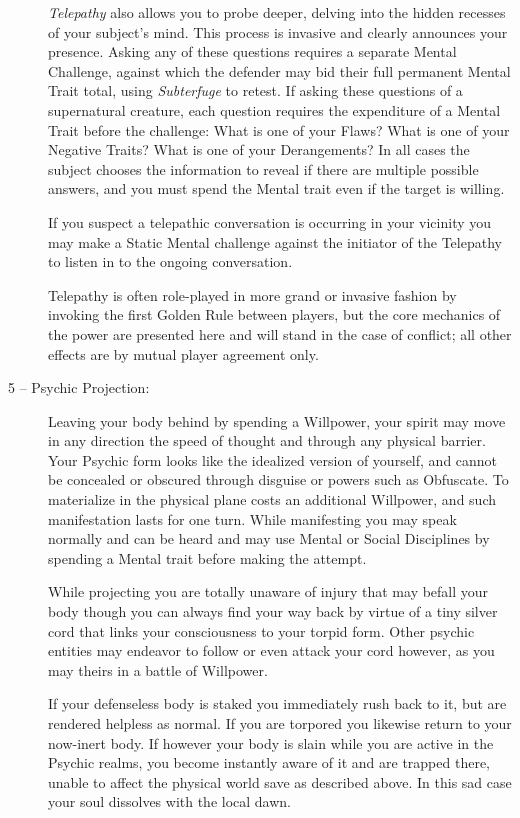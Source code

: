 \begin{description}
	\emph{Telepathy} also allows you to probe deeper, delving into the hidden recesses 
	of your subject's mind.  This process is invasive and clearly announces your presence.  
	Asking any of these questions requires a separate Mental Challenge, against which the 
	defender may bid their full permanent Mental Trait total, using \emph{Subterfuge} to 
	retest.  If asking these questions of a supernatural creature, each question requires 
	the expenditure of a Mental Trait before the challenge:  What is one of your Flaws?  
	What is one of your Negative Traits?  What is one of your Derangements?  In all cases 
	the subject chooses the information to reveal if there are multiple possible answers, 
	and you must spend the Mental trait even if the target is willing.
	
	If you suspect a telepathic conversation is occurring in your vicinity you may 
	make a Static Mental challenge against the initiator of the Telepathy to listen in 
	to the ongoing conversation.  
	
	Telepathy is often role-played in more grand or invasive fashion by invoking the first 
	Golden Rule between players, but the core mechanics of the power are presented here and 
	will stand in the case of conflict; all other effects are by mutual player agreement only.
	\item[5 -- Psychic Projection:]  Leaving your body behind by spending a Willpower, your 
	spirit may move in any direction the speed of thought and through any physical barrier.  Your 
	Psychic form looks like the idealized version of yourself, and cannot be concealed or obscured 
	through disguise or powers such as Obfuscate.  To materialize in the physical plane costs an 
	additional Willpower, and such manifestation lasts for one turn.  While manifesting 
	you may speak normally and can be heard and may use Mental or Social 
	Disciplines by spending a Mental trait before making the attempt. 
	
	While projecting you are totally unaware of injury that may befall your body though you 
	can always find your way back by virtue of a tiny silver cord that links your 
	consciousness to your torpid form.  Other psychic entities may endeavor to follow 
	or even attack your cord however, as you may theirs in a battle of Willpower.  
	
	If your defenseless body is staked you immediately rush back to it, but are rendered helpless as 
	normal.  If you are torpored you likewise return to your now-inert body.  If however your body is 
	slain while you are active in the Psychic realms, you become instantly aware of it and are trapped 
	there, unable to affect the physical world save as described above.  In this sad case your soul 
	dissolves with the local dawn.
	

\end{description}
